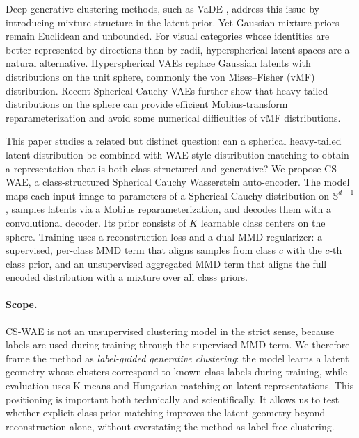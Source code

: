 \documentclass[10pt]{article}
\begin{document}
Deep generative clustering methods, such as VaDE \citep{jiang2016variational}, address this issue by introducing mixture structure in the latent prior. Yet Gaussian mixture priors remain Euclidean and unbounded. For visual categories whose identities are better represented by directions than by radii, hyperspherical latent spaces are a natural alternative. Hyperspherical VAEs \citep{davidson2018hyperspherical} replace Gaussian latents with distributions on the unit sphere, commonly the von Mises--Fisher (vMF) distribution. Recent Spherical Cauchy VAEs \citep{sablica2025hyperspherical} further show that heavy-tailed distributions on the sphere can provide efficient Mobius-transform reparameterization and avoid some numerical difficulties of vMF distributions.

This paper studies a related but distinct question: can a spherical heavy-tailed latent distribution be combined with WAE-style distribution matching to obtain a representation that is both class-structured and generative? We propose CS-WAE, a class-structured Spherical Cauchy Wasserstein auto-encoder. The model maps each input image to parameters of a Spherical Cauchy distribution on $\mathbb{S}^{d-1}$, samples latents via a Mobius reparameterization, and decodes them with a convolutional decoder. Its prior consists of $K$ learnable class centers on the sphere. Training uses a reconstruction loss and a dual MMD regularizer: a supervised, per-class MMD term that aligns samples from class $c$ with the $c$-th class prior, and an unsupervised aggregated MMD term that aligns the full encoded distribution with a mixture over all class priors.

\paragraph{Scope.}
CS-WAE is not an unsupervised clustering model in the strict sense, because labels are used during training through the supervised MMD term. We therefore frame the method as \emph{label-guided generative clustering}: the model learns a latent geometry whose clusters correspond to known class labels during training, while evaluation uses K-means and Hungarian matching on latent representations. This positioning is important both technically and scientifically. It allows us to test whether explicit class-prior matching improves the latent geometry beyond reconstruction alone, without overstating the method as label-free clustering.
\end{document}
